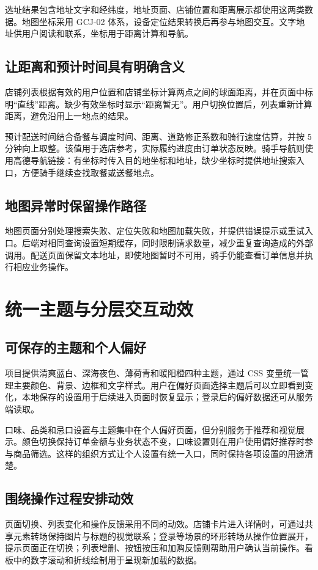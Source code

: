 选址结果包含地址文字和经纬度，地址页面、店铺位置和距离展示都使用这两类数据。地图坐标采用 GCJ-02 体系，设备定位结果转换后再参与地图交互。文字地址供用户阅读和联系，坐标用于距离计算和导航。

\subsection{让距离和预计时间具有明确含义}
店铺列表根据有效的用户位置和店铺坐标计算两点之间的球面距离，并在页面中标明“直线”距离。缺少有效坐标时显示“距离暂无”。用户切换位置后，列表重新计算距离，避免沿用上一地点的结果。

预计配送时间结合备餐与调度时间、距离、道路修正系数和骑行速度估算，并按 5 分钟向上取整。该值用于选店参考，实际履约进度由订单状态反映。骑手导航则使用高德导航链接：有坐标时传入目的地坐标和地址，缺少坐标时提供地址搜索入口，方便骑手继续查找取餐或送餐地点。

\subsection{地图异常时保留操作路径}
地图页面分别处理搜索失败、定位失败和地图加载失败，并提供错误提示或重试入口。后端对相同查询设置短期缓存，同时限制请求数量，减少重复查询造成的外部调用。配送页面保留文本地址，即使地图暂时不可用，骑手仍能查看订单信息并执行相应业务操作。

\section{统一主题与分层交互动效}
\subsection{可保存的主题和个人偏好}
项目提供清爽蓝白、深海夜色、薄荷青和暖阳橙四种主题，通过 CSS 变量统一管理主要颜色、背景、边框和文字样式。用户在偏好页面选择主题后可以立即看到变化，本地保存的设置用于后续进入页面时恢复显示；登录后的偏好数据还可从服务端读取。

口味、品类和忌口设置与主题集中在个人偏好页面，但分别服务于推荐和视觉展示。颜色切换保持订单金额与业务状态不变，口味设置则在用户使用偏好推荐时参与商品筛选。这样的组织方式让个人设置有统一入口，同时保持各项设置的用途清楚。

\subsection{围绕操作过程安排动效}
页面切换、列表变化和操作反馈采用不同的动效。店铺卡片进入详情时，可通过共享元素转场保持图片与标题的视觉联系；登录等场景的环形转场从操作位置展开，提示页面正在切换；列表增删、按钮按压和加购反馈则帮助用户确认当前操作。看板中的数字滚动和折线绘制用于呈现新加载的数据。

